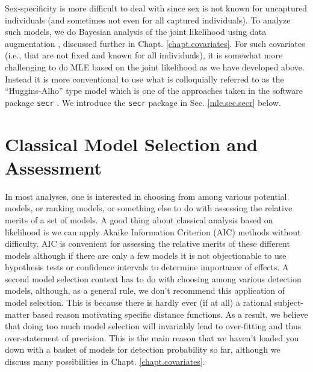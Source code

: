 Sex-specificity is more difficult to deal with since sex is not known
for uncaptured individuals (and sometimes not even for all captured
individuals).  To analyze such models, we do Bayesian analysis of the
joint likelihood using data augmentation
\citep{gardner_etal:2010jwm,russell_etal:2012}, discussed further in
Chapt. \ref{chapt.covariates}. For such covariates (i.e., that are not
fixed and known for all individuals), it is somewhat more challenging
to do MLE based on the joint likelihood as we have developed
above. Instead it is more conventional to use what is colloquially
referred to as the ``Huggins-Alho'' type model which is one of the
approaches taken in the software package \mbox{\tt secr}
\citep[][]{efford:2011}.  We introduce the \mbox{\tt secr} package in
Sec. \ref{mle.sec.secr} below.



\section{Classical Model Selection and Assessment}

In most analyses, one is interested in choosing from among various
potential models, or ranking models, or something else to do with
assessing the relative merits of a set of models. A good thing about
classical analysis based on likelihood is we can apply Akaike
Information Criterion (AIC) methods \citep{burnham_anderson:2002}
without difficulty.  AIC is convenient for assessing the relative
merits of these different models although if there are only a few
models it is not objectionable to use hypothesis tests or confidence
intervals to determine importance of effects.  A second model
selection context has to do with choosing among various detection
models, although, as a general rule, we don't recommend this
application of model selection.  This is because there is hardly ever
(if at all) a rational subject-matter based reason motivating specific
distance functions. As a result, we believe that doing too much model
selection will invariably lead to over-fitting and thus over-statement
of precision. This is the main reason that we haven't loaded you down
with a basket of models for detection probability so far, although we
discuss many possibilities in Chapt. \ref{chapt.covariates}.


